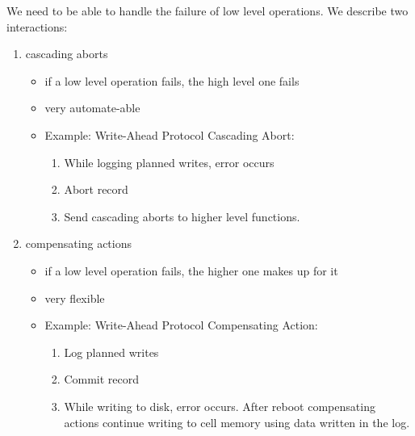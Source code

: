 \documentclass[../../lecture_notes.tex]{subfiles}
\begin{document}
We need to be able to handle the failure of low level operations. We describe two interactions:
\begin{enumerate}
\item cascading aborts
	\begin{itemize}
	\item if a low level operation fails, the high level one fails
	\item very automate-able
	\item Example: Write-Ahead Protocol Cascading Abort:
		\begin{enumerate}
			\item While logging planned writes, error occurs
			\item Abort record
			\item Send cascading aborts to higher level functions.
		\end{enumerate}
	\end{itemize}
\item compensating actions
	\begin{itemize}
		\item if a low level operation fails, the higher one makes up for it
		\item very flexible
		\item Example: Write-Ahead Protocol Compensating Action:
		\begin{enumerate}
			\item Log planned writes
			\item Commit record
			\item While writing to disk, error occurs. After reboot compensating actions continue writing to cell memory using data written in the log.
		\end{enumerate}
	\end{itemize}
\end{enumerate}
\end{document}
